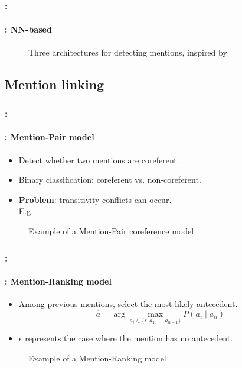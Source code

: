 \documentclass[xcolor=table]{beamer}
\begin{document}
\begin{frame}
	\frametitle{\insertshortsubtitle: \insertsection}
	\framesubtitle{\insertsubsection: NN-based \cite{2020-yu-al}}
	
	\begin{figure}[ht]
		\centering
		\caption{Three architectures for detecting mentions, inspired by \cite{2020-yu-al}}
		\label{fig:det-mention-yu}
	\end{figure}
	
\end{frame}



\subsection{Mention linking}

\begin{frame}
	\frametitle{\insertshortsubtitle: \insertsection}
	\framesubtitle{\insertsubsection: Mention-Pair model}
	
	\begin{itemize}
		\item Detect whether two mentions are coreferent.
		\item Binary classification: coreferent vs. non-coreferent.
		\item \textbf{Problem}: transitivity conflicts can occur.  \\ 
		E.g. 
	\end{itemize}
	\begin{figure}
		\centering
		\caption{Example of a Mention-Pair coreference model \cite{2019-jurafsky-martin}}
	\end{figure}
	
\end{frame}

\begin{frame}
	\frametitle{\insertshortsubtitle: \insertsection}
	\framesubtitle{\insertsubsection: Mention-Ranking model}
	
	\begin{itemize}
		\item Among previous mentions, select the most likely antecedent.
		\[\hat{a} = \arg\max\limits_{a_i \in \{\epsilon, a_1, \ldots, a_{n-1}\}} P(a_i \mid a_n)\]
		\item $ \epsilon $ represents the case where the mention has no antecedent.
	\end{itemize}
	\begin{figure}
		\centering
		\caption{Example of a Mention-Ranking model \cite{2019-jurafsky-martin}}
	\end{figure}
	
\end{frame}
\end{document}
